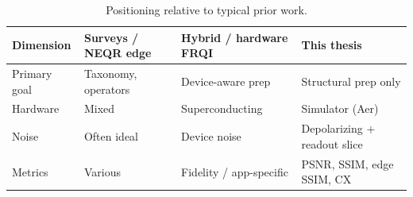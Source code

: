 \begin{table}[htbp]
\centering
\caption{Positioning relative to typical prior work.}
\label{tab:positioning}
\small
\begin{tabular}{p{2.8cm}p{3.5cm}p{3.5cm}p{3.5cm}}
\toprule
Dimension & Surveys / NEQR edge & Hybrid / hardware FRQI & This thesis \\
\midrule
Primary goal & Taxonomy, operators & Device-aware prep & Structural prep only \\
Hardware & Mixed & Superconducting & Simulator (Aer) \\
Noise & Often ideal & Device noise & Depolarizing + readout slice \\
Metrics & Various & Fidelity / app-specific & PSNR, SSIM, edge SSIM, CX \\
\bottomrule
\end{tabular}
\end{table}
